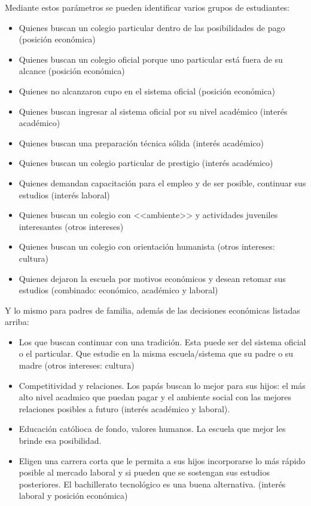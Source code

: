 Mediante estos parámetros se pueden identificar varios grupos de estudiantes:

\begin{itemize}
	\item Quienes buscan un colegio particular dentro de las posibilidades de pago (posición económica)
	\item Quienes buscan un colegio oficial porque uno particular está fuera de su alcance (posición económica)
	\item Quienes no alcanzaron cupo en el sistema oficial (posición económica)
	\item Quienes buscan ingresar al sistema oficial por su nivel académico (interés académico)
	\item Quienes buscan una preparación técnica sólida (interés académico)
	\item Quienes buscan un colegio particular de prestigio (interés académico)
	\item Quienes demandan capacitación para el empleo y de ser posible, continuar sus estudios (interés laboral)
	\item Quienes buscan un colegio con <<ambiente>> y actividades juveniles interesantes (otros intereses)
	\item Quienes buscan un colegio con orientación humanista (otros intereses: cultura)
	\item Quienes dejaron la escuela por motivos económicos y desean retomar sus estudios (combinado: económico, académico y laboral)
\end{itemize}

Y lo mismo para padres de familia, además de las decisiones económicas listadas arriba:

\begin{itemize}
	\item Los que buscan continuar con una tradición. Esta puede ser del sistema oficial o el particular. Que estudie en la misma escuela/sistema que su padre o su madre (otros intereses: cultura)
	\item Competitividad y relaciones. Los papás buscan lo mejor para sus hijos: el más alto nivel acadmico que puedan pagar y el ambiente social con las mejores relaciones posibles a futuro (interés académico y laboral).
	\item Educación católioca de fondo, valores humanos. La escuela que mejor les brinde esa posibilidad.
	\item Eligen una carrera corta que le permita a sus hijos incorporarse lo más rápido posible al mercado laboral y si pueden que se sostengan sus estudios posteriores. El bachillerato tecnológico es una buena alternativa. (interés laboral y posición económica)
\end{itemize}

